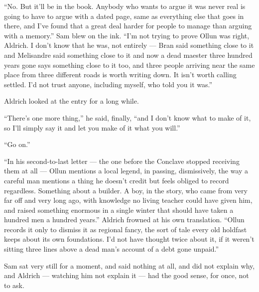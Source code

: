 “No. But it’ll be in the book. Anybody who wants to argue it was never real is going to have to argue with a dated page, same as everything else that goes in there, and I’ve found that a great deal harder for people to manage than arguing with a memory.” Sam blew on the ink. “I’m not trying to prove Ollun was right, Aldrich. I don’t know that he was, not entirely — Bran said something close to it and Melisandre said something close to it and now a dead maester three hundred years gone says something close to it too, and three people arriving near the same place from three different roads is worth writing down. It isn’t worth calling settled. I’d not trust anyone, including myself, who told you it was.”

Aldrich looked at the entry for a long while.

“There’s one more thing,” he said, finally, “and I don’t know what to make of it, so I’ll simply say it and let you make of it what you will.”

“Go on.”

“In his second-to-last letter — the one before the Conclave stopped receiving them at all — Ollun mentions a local legend, in passing, dismissively, the way a careful man mentions a thing he doesn’t credit but feels obliged to record regardless. Something about a builder. A boy, in the story, who came from very far off and very long ago, with knowledge no living teacher could have given him, and raised something enormous in a single winter that should have taken a hundred men a hundred years.” Aldrich frowned at his own translation. “Ollun records it only to dismiss it as regional fancy, the sort of tale every old holdfast keeps about its own foundations. I’d not have thought twice about it, if it weren’t sitting three lines above a dead man’s account of a debt gone unpaid.”

Sam sat very still for a moment, and said nothing at all, and did not explain why, and Aldrich — watching him not explain it — had the good sense, for once, not to ask.